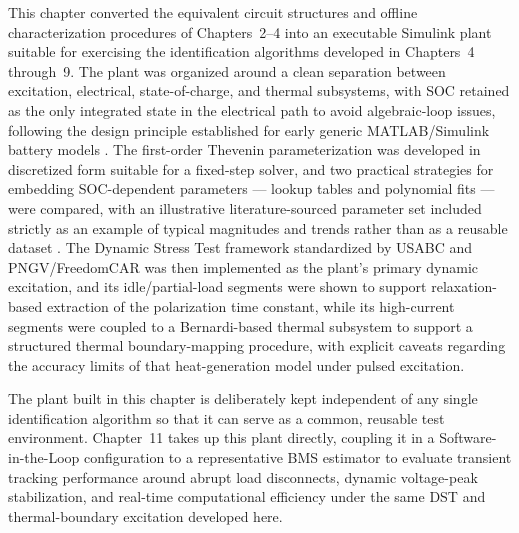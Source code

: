 This chapter converted the equivalent circuit structures and offline
characterization procedures of Chapters~2--4 into an executable
Simulink plant suitable for exercising the identification algorithms
developed in Chapters~4 through~9. The plant was organized around a
clean separation between excitation, electrical, state-of-charge, and
thermal subsystems, with SOC retained as the only integrated state in
the electrical path to avoid algebraic-loop issues, following the
design principle established for early generic MATLAB/Simulink
battery models \cite{tremblay2007,tremblay2009}. The first-order
Thevenin parameterization was developed in discretized form suitable
for a fixed-step solver, and two practical strategies for embedding
SOC-dependent parameters — lookup tables and polynomial fits — were
compared, with an illustrative literature-sourced parameter set
included strictly as an example of typical magnitudes and trends
rather than as a reusable dataset \cite{barletta2022}. The Dynamic
Stress Test framework standardized by USABC and PNGV/FreedomCAR was
then implemented as the plant's primary dynamic excitation, and its
idle/partial-load segments were shown to support relaxation-based
extraction of the polarization time constant, while its high-current
segments were coupled to a Bernardi-based thermal subsystem to support
a structured thermal boundary-mapping procedure, with explicit caveats
regarding the accuracy limits of that heat-generation model under
pulsed excitation.

The plant built in this chapter is deliberately kept independent of
any single identification algorithm so that it can serve as a common,
reusable test environment. Chapter~11 takes up this plant directly,
coupling it in a Software-in-the-Loop configuration to a representative
BMS estimator to evaluate transient tracking performance around abrupt
load disconnects, dynamic voltage-peak stabilization, and real-time
computational efficiency under the same DST and thermal-boundary
excitation developed here.



